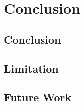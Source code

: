 \chapter[Conclusion]{Conclusion}
\label{Chap:Conclusion}

\section{Conclusion}
\section{Limitation}
\section{Future Work}





